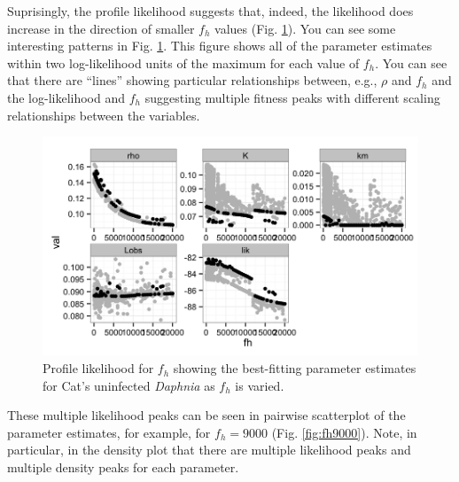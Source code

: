 \documentclass[12pt,reqno,final,pdftex]{amsart}\usepackage[]{graphicx}\usepackage[]{color}
\newenvironment{knitrout}{}{} %
\theoremstyle{plain}
\numberwithin{equation}{part}
\begin{document}
Suprisingly, the profile likelihood suggests that, indeed, the likelihood does increase in the direction of smaller $f_h$ values (Fig. \ref{fig:Cat-profile-lik-fh}).
You can see some interesting patterns in Fig. \ref{fig:Cat-profile-lik-fh}.
This figure shows all of the parameter estimates within two log-likelihood units of the maximum for each value of $f_h$.
You can see that there are ``lines'' showing particular relationships between, e.g., $\rho$ and $f_h$ and the log-likelihood and $f_h$ suggesting multiple fitness peaks with different scaling relationships between the variables.
\begin{knitrout}\scriptsize
{}\color{fgcolor}\begin{figure}

\includegraphics[width=\linewidth]{figure/Cat-profile-lik-fh-1} \hfill{}

\caption[Profile likelihood for ]{Profile likelihood for $f_h$ showing the best-fitting parameter estimates for Cat's uninfected \emph{Daphnia} as $f_h$ is varied.}\label{fig:Cat-profile-lik-fh}
\end{figure}


\end{knitrout}

These multiple likelihood peaks can be seen in pairwise scatterplot of the parameter estimates, for example, for $f_h=9000$ (Fig. \ref{fig:fh9000}).
Note, in particular, in the density plot that there are multiple likelihood peaks and multiple density peaks for each parameter.
\end{document}
